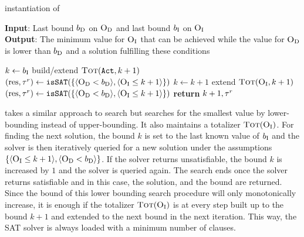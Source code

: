 \begin{algorithm}[t]
  \caption{\unsatsat{} instantiation of \Min{}}\label{alg:unsat-sat}
  \textbf{Input}: Last bound $b_{\text{D}}$ on $\textsc{O}_{\text{D}}$ and last bound $b_{\text{I}}$ on $\textsc{O}_{\text{I}}$ \\
  \textbf{Output}: The minimum value for $\textsc{O}_{\text{I}}$ that can be achieved while the value for $\textsc{O}_{\text{D}}$ is lower than $b_{\text{D}}$ and a solution fulfilling these conditions

  \begin{algorithmic}[1]
    \STATE $k \gets b_{\text{I}}$
    \STATE build/extend $\textsc{Tot}(\texttt{Act},k+1)$
    \STATE $(\text{res},\tau^r) \gets \texttt{isSAT}(\{\langle \textsc{O}_{\text{D}} < b_{\text{D}} \rangle, \langle \textsc{O}_{\text{I}} \leq k+1 \rangle\})$
      \STATE $k \gets k+1$
      \STATE extend $\textsc{Tot}(\textsc{O}_{\text{I}},k+1)$
      \STATE $(\text{res},\tau^r) \gets \texttt{isSAT}(\{\langle \textsc{O}_{\text{D}} < b_{\text{D}} \rangle, \langle \textsc{O}_{\text{I}} \leq k+1 \rangle\})$
    \ENDWHILE
    \STATE \textbf{return} $k+1,\tau^r$
  \end{algorithmic}
\end{algorithm}

\unsatsat{} takes a similar approach to \satunsat{} search but searches for the smallest value by lower-bounding instead of upper-bounding.
It also maintains a totalizer $\textsc{Tot}(\textsc{O}_{\text{I}})$.
For finding the next solution, the bound $k$ is set to the last known value of $b_{\text{I}}$ and the solver is then iteratively queried for a new solution under the assumptions $\{ \langle \textsc{O}_{\text{I}} \leq k+1 \rangle, \langle \textsc{O}_{\text{D}} < b_{\text{D}} \rangle \}$.
If the solver returns unsatisfiable, the bound $k$ is increased by $1$ and the solver is queried again.
The search ends once the solver returns satisfiable and in this case, the solution, and the bound are returned.
Since the bound of this lower bounding search procedure will only monotonically increase, it is enough if the totalizer $\textsc{Tot}(\textsc{O}_{\text{I}})$ is at every step built up to the bound $k+1$ and extended to the next bound in the next iteration.
This way, the SAT solver is always loaded with a minimum number of clauses.


